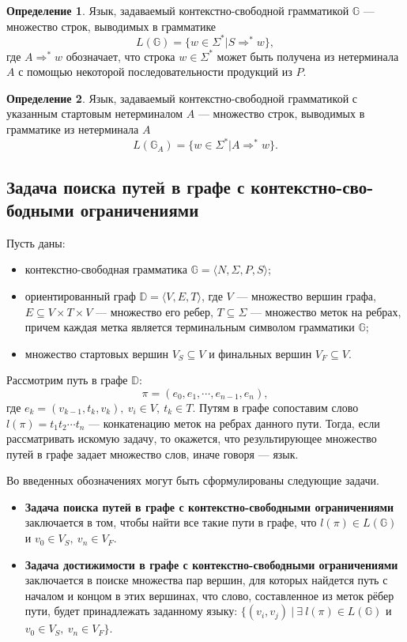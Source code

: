 \documentclass[14pt]{matmex-diploma-custom}
\theoremstyle{definition}
\newtheorem{rudefinition}{Определение}[section]
\begin{document}
\begin{rudefinition}
     Язык, задаваемый контекстно-свободной грамматикой $\mathbb{G}$ --- множество строк, выводимых в грамматике $$L(\mathbb{G}) = \{ w \in \Sigma^* | S \Rightarrow^* w\}, $$
     где $ A \Rightarrow^* w$ обозначает, что строка $w \in \Sigma^*$ может быть получена из нетерминала $A$ с помощью некоторой последовательности продукций из $P$.
\end{rudefinition}

\begin{rudefinition}
Язык, задаваемый контекстно-свободной грамматикой с указанным стартовым нетерминалом $A$ --- множество строк, выводимых в грамматике из нетерминала $A$ $$L(\mathbb{G}_A) = \{ w \in \Sigma^* | A \Rightarrow^* w\}.$$
\end{rudefinition}

\subsection{Задача поиска путей в графе с контекстно-сво-бодными ограничениями}
Пусть даны:
\begin{itemize}
     \item контекстно-свободная грамматика $\mathbb{G}  = \langle N, \Sigma, P, S \rangle$;
     \item ориентированный граф $ \mathbb{D} = \langle V, E, T \rangle$, где $V$ --- множество вершин графа, $E \subseteq V \times T \times V $ --- множество его ребер, $T \subseteq \Sigma $ --- множество меток на ребрах, причем каждая метка является терминальным символом грамматики $\mathbb{G}$;
\item множество стартовых вершин $V_S \subseteq V$  и финальных вершин \mbox{$V_F \subseteq V$.}
\end{itemize}

Рассмотрим путь в графе $\mathbb{D}$: $$\pi = (e_0, e_1, \cdots, e_{n - 1}, e_n),$$ где $e_k = (v_{k - 1}, t_k, v_k), ~ v_i \in V,~t_k \in T $.
Путям в графе сопоставим слово $l(\pi) = t_1t_2 \cdots t_n$ --- конкатенацию меток на ребрах данного пути.
Тогда, если рассматривать искомую задачу, то окажется, что результирующее множество путей в графе задает множество слов, иначе говоря --- язык. 

Во введенных обозначениях могут быть сформулированы следующие задачи.
\begin{itemize}
    \item \textbf{Задача поиска путей в графе с контекстно-свободными ограничениями} заключается в том, чтобы найти все такие пути в графе, что $l(\pi) \in L(\mathbb{G})$ и $v_0 \in V_S, ~v_n \in V_F$.
    
    \item \textbf{Задача достижимости в графе с контекстно-свободными ограничениями} заключается в поиске множества пар вершин, для которых найдется путь с началом и концом в этих вершинах, что слово, составленное из меток рёбер пути, будет принадлежать заданному языку: $\{(v_i, v_j ) ~|~ \exists ~l(\pi) \in L(\mathbb{G})$ и $v_0 \in V_S, ~v_n \in V_F\}$.
\end{itemize}
\end{document}
